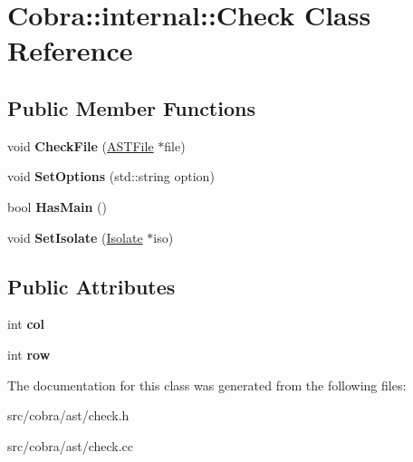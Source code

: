 \hypertarget{class_cobra_1_1internal_1_1_check}{\section{Cobra\+:\+:internal\+:\+:Check Class Reference}
\label{class_cobra_1_1internal_1_1_check}
}
\subsection*{Public Member Functions}
\begin{DoxyCompactItemize}
\item 
\hypertarget{class_cobra_1_1internal_1_1_check_aceadf25dcbd139918ddcc751dddadaed}{void {\bfseries Check\+File} (\hyperlink{class_cobra_1_1internal_1_1_a_s_t_file}{A\+S\+T\+File} $\ast$file)}\label{class_cobra_1_1internal_1_1_check_aceadf25dcbd139918ddcc751dddadaed}

\item 
\hypertarget{class_cobra_1_1internal_1_1_check_a5b9360505f85697d3a4b06f371255c9d}{void {\bfseries Set\+Options} (std\+::string option)}\label{class_cobra_1_1internal_1_1_check_a5b9360505f85697d3a4b06f371255c9d}

\item 
\hypertarget{class_cobra_1_1internal_1_1_check_a0221d7a96e1581a4e9c9f097c0cb75b7}{bool {\bfseries Has\+Main} ()}\label{class_cobra_1_1internal_1_1_check_a0221d7a96e1581a4e9c9f097c0cb75b7}

\item 
\hypertarget{class_cobra_1_1internal_1_1_check_afb99bd541cf71b4abc5ccfc7a583a7c2}{void {\bfseries Set\+Isolate} (\hyperlink{class_cobra_1_1internal_1_1_isolate}{Isolate} $\ast$iso)}\label{class_cobra_1_1internal_1_1_check_afb99bd541cf71b4abc5ccfc7a583a7c2}

\end{DoxyCompactItemize}
\subsection*{Public Attributes}
\begin{DoxyCompactItemize}
\item 
\hypertarget{class_cobra_1_1internal_1_1_check_a5ac845f4fe07186c2b175c5021cf3205}{int {\bfseries col}}\label{class_cobra_1_1internal_1_1_check_a5ac845f4fe07186c2b175c5021cf3205}

\item 
\hypertarget{class_cobra_1_1internal_1_1_check_aa5dab76efd3b801cd18d56b0806ca020}{int {\bfseries row}}\label{class_cobra_1_1internal_1_1_check_aa5dab76efd3b801cd18d56b0806ca020}

\end{DoxyCompactItemize}


The documentation for this class was generated from the following files\+:\begin{DoxyCompactItemize}
\item 
src/cobra/ast/check.\+h\item 
src/cobra/ast/check.\+cc\end{DoxyCompactItemize}
